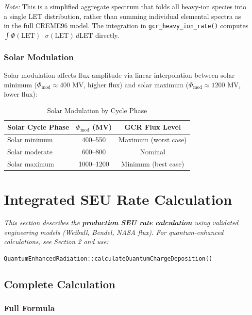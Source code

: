 \documentclass[11pt,a4paper]{article}
\begin{document}
\textit{Note:} This is a simplified aggregate spectrum that folds all heavy-ion species into a single LET distribution, rather than summing individual elemental spectra as in the full CREME96 model. The integration in \texttt{gcr\_heavy\_ion\_rate()} computes $\int \Phi(\text{LET}) \cdot \sigma(\text{LET})\, d\text{LET}$ directly.

\subsubsection{Solar Modulation}

Solar modulation affects flux amplitude via linear interpolation between solar minimum ($\Phi_{\text{mod}} \approx 400$ MV, higher flux) and solar maximum ($\Phi_{\text{mod}} \approx 1200$ MV, lower flux):

\begin{table}[htbp]
\centering
\caption{Solar Modulation by Cycle Phase}
\begin{tabular}{@{}lcc@{}}
\toprule
\textbf{Solar Cycle Phase} & $\Phi_{\text{mod}}$ \textbf{(MV)} & \textbf{GCR Flux Level} \\ \midrule
Solar minimum & 400--550 & Maximum (worst case) \\
Solar moderate & 600--800 & Nominal \\
Solar maximum & 1000--1200 & Minimum (best case) \\ \bottomrule
\end{tabular}
\end{table}

\newpage
\section{Integrated SEU Rate Calculation}

\textit{This section describes the \textbf{production SEU rate calculation} using validated engineering models (Weibull, Bendel, NASA flux). For quantum-enhanced calculations, see Section 2 and use:}

\texttt{QuantumEnhancedRadiation::calculateQuantumChargeDeposition()}

\subsection{Complete Calculation}

\subsubsection{Full Formula}
\end{document}
